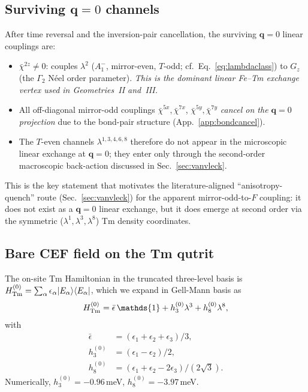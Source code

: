 \documentclass[reprint,amsmath,amssymb,aps,prb,longbibliography]{revtex4-2}
\begin{document}
\subsection{Surviving \texorpdfstring{$\mathbf q\!=\!0$}{q=0} channels}

After time reversal and the inversion-pair cancellation, the surviving
$\mathbf q=0$ linear couplings are:
\begin{itemize}[leftmargin=*]
\item $\bar\chi^{2z}\neq 0$: couples $\lambda^2$ ($A_1^-$, mirror-even,
$T$-odd; cf.\ Eq.~\eqref{eq:lambdaclass}) to $G_z$ (the $\Gamma_2$ N\'eel order parameter). \emph{This is
the dominant linear Fe--Tm exchange vertex used in Geometries~II and~III.}
\item All off-diagonal mirror-odd couplings $\bar\chi^{5x}, \bar\chi^{7x}$,
$\bar\chi^{5y}, \bar\chi^{7y}$ \emph{cancel
on the $\mathbf q=0$ projection} due to the bond-pair structure (App.~\ref{app:bondcancel}).
\item The $T$-even channels $\lambda^{1,3,4,6,8}$ therefore do not appear
in the microscopic linear exchange at $\mathbf q=0$; they enter only
through the second-order macroscopic back-action discussed in
Sec.~\ref{sec:vanvleck}.
\end{itemize}
This is the key statement that motivates the literature-aligned
``anisotropy-quench'' route (Sec.~\ref{sec:vanvleck}) for the apparent
mirror-odd-to-$F$ coupling: it does not exist as a $\mathbf q=0$ linear
exchange, but it does emerge at second order via the symmetric
($\lambda^1, \lambda^3, \lambda^8$) Tm density coordinates.

\subsection{Bare CEF field on the Tm qutrit}
\label{sec:bareCEFfield}

The on-site Tm Hamiltonian in the truncated three-level basis is
$H_{\rm Tm}^{(0)} = \sum_\alpha\epsilon_\alpha|E_\alpha\rangle\langle E_\alpha|$,
which we expand in Gell-Mann basis as
\begin{equation}
H_{\rm Tm}^{(0)} = \bar\epsilon\,\mathds{1} + h^{(0)}_3\lambda^3 + h^{(0)}_8\lambda^8,
\label{eq:HTm0}
\end{equation}
with
\begin{equation}
\begin{aligned}
\bar\epsilon &= (\epsilon_1+\epsilon_2+\epsilon_3)/3,\\
h^{(0)}_3 &= (\epsilon_1-\epsilon_2)/2,\\
h^{(0)}_8 &= (\epsilon_1+\epsilon_2-2\epsilon_3)/(2\sqrt{3}).
\end{aligned}
\label{eq:hbareCEF}
\end{equation}
Numerically, $h^{(0)}_3 = -0.96$\,meV, $h^{(0)}_8 = -3.97$\,meV.
\end{document}

